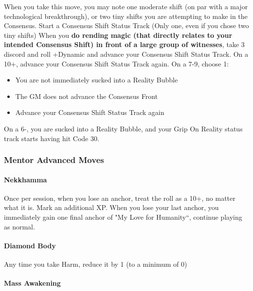 \documentclass[
  oneside,
  statementpaper,
  9pt]{memoir}
\begin{document}
When you take this move, you may note one moderate shift (on par with a
major technological breakthrough), or two tiny shifts you are attempting
to make in the Consensus. Start a Consensus Shift Status Track (Only
one, even if you chose two tiny shifts) When you \textbf{do rending
magic (that directly relates to your intended Consensus Shift) in front
of a large group of witnesses}, take 3 discord and roll +Dynamic and
advance your Consensus Shift Status Track. On a 10+, advance your
Consensus Shift Status Track again. On a 7-9, choose 1:

\begin{itemize}
\item
  You are not immediately sucked into a Reality Bubble
\item
  The GM does not advance the Consensus Front
\item
  Advance your Consensus Shift Status Track again
\end{itemize}

On a 6-, you are sucked into a Reality Bubble, and your Grip On Reality
status track starts having hit Code 30.

\hypertarget{mentor-advanced-moves}{%
\subsubsection{Mentor Advanced Moves}\label{mentor-advanced-moves}}

\hypertarget{nekkhamma}{%
\paragraph{Nekkhamma}\label{nekkhamma}}

Once per session, when you lose an anchor, treat the roll as a 10+, no
matter what it is. Mark an additional XP. When you lose your last
anchor, you immediately gain one final anchor of "My Love for
Humanity``, continue playing as normal.

\hypertarget{diamond-body}{%
\paragraph{Diamond Body}\label{diamond-body}}

Any time you take Harm, reduce it by 1 (to a minimum of 0)

\hypertarget{mass-awakening}{%
\paragraph{Mass Awakening}\label{mass-awakening}}
\end{document}
